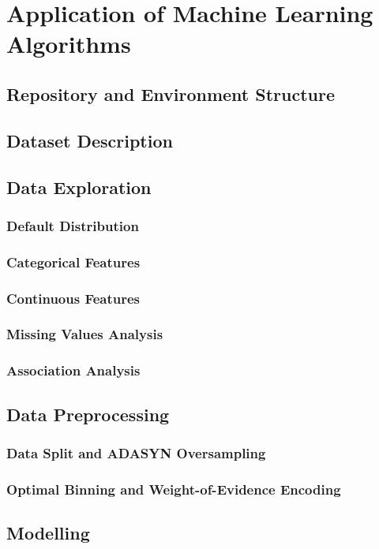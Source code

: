 \chapter{Application of Machine Learning Algorithms}
\label{chap:four}

\section{Repository and Environment Structure}
\section{Dataset Description}
\section{Data Exploration}
\subsection{Default Distribution}
\subsection{Categorical Features}
\subsection{Continuous Features}
\subsection{Missing Values Analysis}
\subsection{Association Analysis}
\section{Data Preprocessing}
\subsection{Data Split and ADASYN Oversampling}
\subsection{Optimal Binning and Weight-of-Evidence Encoding}
\section{Modelling}
